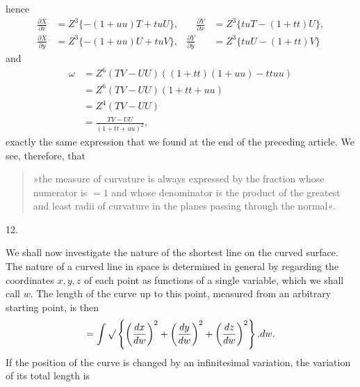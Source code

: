 %
hence
\[
\begin{aligned}
\frac{\partial X}{\partial x}&=Z^{3}\{-(1+uu)T+tuU\},&\quad\frac{\partial Y}{\partial x}&=Z^{3}\{tuT-(1+tt)U\},\\
\frac{\partial X}{\partial y}&=Z^{3}\{-(1+uu)U+tuV\},&\frac{\partial Y}{\partial y}&=Z^{3}\{tuU-(1+tt)V\}
\end{aligned}
\]
and
\[
\begin{aligned}
\omega&=Z^{6}(TV-UU)((1+tt)(1+uu)-ttuu)\\
&=Z^{6}(TV-UU)(1+tt+uu)\\
&=Z^{4}(TV-UU)\\
&=\frac{TV-UU}{(1+tt+uu)^{2}},
\end{aligned}
\]
exactly the same expression that we found at the end of the preceding article. We see, therefore, that
\begin{quote}
»the measure of curvature is always expressed by the fraction whose numerator is $=1$ and whose denominator is the product of the greatest and least radii of curvature in the planes passing through the normal«.
\end{quote}

\begin{center}12.\end{center}
\noindent\hspace*{1.2em}We shall now investigate the nature of the shortest line on the curved surface. The nature of a curved line in space is determined in general by regarding the coordinates $x,y,z$ of each point as functions of a single variable, which we shall call $w$. The length of the curve up to this point, measured from an arbitrary starting point, is then
\[
=\int\mathord{\surd}\left\{\left(\frac{dx}{dw}\right)^{2}+\left(\frac{dy}{dw}\right)^{2}+\left(\frac{dz}{dw}\right)^{2}\right\}.dw.
\]
If the position of the curve is changed by an infinitesimal variation, the variation of its total length is
